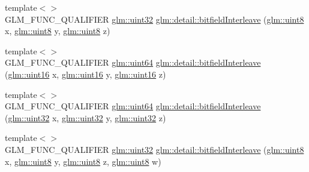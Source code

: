 \begin{DoxyCompactItemize}
\item 
{\footnotesize template$<$$>$ }\\G\+L\+M\+\_\+\+F\+U\+N\+C\+\_\+\+Q\+U\+A\+L\+I\+F\+I\+E\+R \hyperlink{group__gtc__type__precision_ga202b6a53c105fcb7e531f9b443518451}{glm\+::uint32} \hyperlink{namespaceglm_1_1detail_a27e9c62ce3ad180236573daec6a6461f}{glm\+::detail\+::bitfield\+Interleave} (\hyperlink{group__gtc__type__precision_ga1a7dcd8aac97cc8020817c94049deff2}{glm\+::uint8} x, \hyperlink{group__gtc__type__precision_ga1a7dcd8aac97cc8020817c94049deff2}{glm\+::uint8} y, \hyperlink{group__gtc__type__precision_ga1a7dcd8aac97cc8020817c94049deff2}{glm\+::uint8} z)
\item 
{\footnotesize template$<$$>$ }\\G\+L\+M\+\_\+\+F\+U\+N\+C\+\_\+\+Q\+U\+A\+L\+I\+F\+I\+E\+R \hyperlink{group__gtc__type__precision_gae3632bf9b37da66233d78930dd06378a}{glm\+::uint64} \hyperlink{namespaceglm_1_1detail_aceed48a30e6dc4f2c64945a60369d73d}{glm\+::detail\+::bitfield\+Interleave} (\hyperlink{group__gtc__type__precision_gad8c2939e1fdd8e5828b31d95c52255d5}{glm\+::uint16} x, \hyperlink{group__gtc__type__precision_gad8c2939e1fdd8e5828b31d95c52255d5}{glm\+::uint16} y, \hyperlink{group__gtc__type__precision_gad8c2939e1fdd8e5828b31d95c52255d5}{glm\+::uint16} z)
\item 
{\footnotesize template$<$$>$ }\\G\+L\+M\+\_\+\+F\+U\+N\+C\+\_\+\+Q\+U\+A\+L\+I\+F\+I\+E\+R \hyperlink{group__gtc__type__precision_gae3632bf9b37da66233d78930dd06378a}{glm\+::uint64} \hyperlink{namespaceglm_1_1detail_a7f6421e0b1180ec986fd91d8eb2d1cc9}{glm\+::detail\+::bitfield\+Interleave} (\hyperlink{group__gtc__type__precision_ga202b6a53c105fcb7e531f9b443518451}{glm\+::uint32} x, \hyperlink{group__gtc__type__precision_ga202b6a53c105fcb7e531f9b443518451}{glm\+::uint32} y, \hyperlink{group__gtc__type__precision_ga202b6a53c105fcb7e531f9b443518451}{glm\+::uint32} z)
\item 
{\footnotesize template$<$$>$ }\\G\+L\+M\+\_\+\+F\+U\+N\+C\+\_\+\+Q\+U\+A\+L\+I\+F\+I\+E\+R \hyperlink{group__gtc__type__precision_ga202b6a53c105fcb7e531f9b443518451}{glm\+::uint32} \hyperlink{namespaceglm_1_1detail_ae3f57ec9a2b938eb31978ccb99f85474}{glm\+::detail\+::bitfield\+Interleave} (\hyperlink{group__gtc__type__precision_ga1a7dcd8aac97cc8020817c94049deff2}{glm\+::uint8} x, \hyperlink{group__gtc__type__precision_ga1a7dcd8aac97cc8020817c94049deff2}{glm\+::uint8} y, \hyperlink{group__gtc__type__precision_ga1a7dcd8aac97cc8020817c94049deff2}{glm\+::uint8} z, \hyperlink{group__gtc__type__precision_ga1a7dcd8aac97cc8020817c94049deff2}{glm\+::uint8} w)

\end{DoxyCompactItemize}
